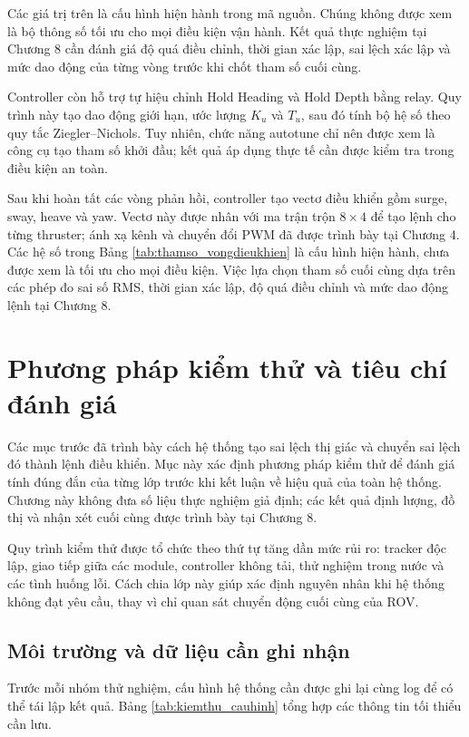 \documentclass[../DoAn.tex]{subfiles}
\begin{document}
Các giá trị trên là cấu hình hiện hành trong mã nguồn. Chúng không được xem là bộ thông số tối ưu cho mọi điều kiện vận hành. Kết quả thực nghiệm tại Chương 8 cần đánh giá độ quá điều chỉnh, thời gian xác lập, sai lệch xác lập và mức dao động của từng vòng trước khi chốt tham số cuối cùng.

Controller còn hỗ trợ tự hiệu chỉnh Hold Heading và Hold Depth bằng relay. Quy trình này tạo dao động giới hạn, ước lượng $K_u$ và $T_u$, sau đó tính bộ hệ số theo quy tắc Ziegler--Nichols. Tuy nhiên, chức năng autotune chỉ nên được xem là công cụ tạo tham số khởi đầu; kết quả áp dụng thực tế cần được kiểm tra trong điều kiện an toàn.

Sau khi hoàn tất các vòng phản hồi, controller tạo vectơ điều khiển gồm surge, sway, heave và yaw. Vectơ này được nhân với ma trận trộn $8 \times 4$ để tạo lệnh cho từng thruster; ánh xạ kênh và chuyển đổi PWM đã được trình bày tại Chương 4. Các hệ số trong Bảng \ref{tab:thamso_vongdieukhien} là cấu hình hiện hành, chưa được xem là tối ưu cho mọi điều kiện. Việc lựa chọn tham số cuối cùng dựa trên các phép đo sai số RMS, thời gian xác lập, độ quá điều chỉnh và mức dao động lệnh tại Chương 8.

\section{Phương pháp kiểm thử và tiêu chí đánh giá}

Các mục trước đã trình bày cách hệ thống tạo sai lệch thị giác và chuyển sai lệch đó thành lệnh điều khiển. Mục này xác định phương pháp kiểm thử để đánh giá tính đúng đắn của từng lớp trước khi kết luận về hiệu quả của toàn hệ thống. Chương này không đưa số liệu thực nghiệm giả định; các kết quả định lượng, đồ thị và nhận xét cuối cùng được trình bày tại Chương 8.

Quy trình kiểm thử được tổ chức theo thứ tự tăng dần mức rủi ro: tracker độc lập, giao tiếp giữa các module, controller không tải, thử nghiệm trong nước và các tình huống lỗi. Cách chia lớp này giúp xác định nguyên nhân khi hệ thống không đạt yêu cầu, thay vì chỉ quan sát chuyển động cuối cùng của ROV.

\subsection{Môi trường và dữ liệu cần ghi nhận}

Trước mỗi nhóm thử nghiệm, cấu hình hệ thống cần được ghi lại cùng log để có thể tái lập kết quả. Bảng \ref{tab:kiemthu_cauhinh} tổng hợp các thông tin tối thiểu cần lưu.
\end{document}
